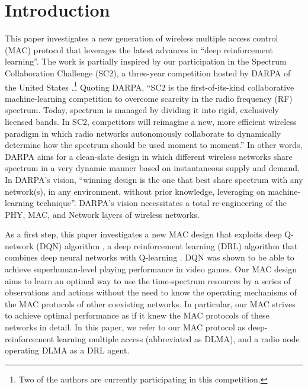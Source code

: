 \documentclass[journal,comsoc]{IEEEtran}
\begin{document}






%
\IEEEpeerreviewmaketitle



\section{Introduction}
This paper investigates a new generation of wireless multiple access control (MAC) protocol that leverages the latest advances in ``deep reinforcement learning''. The work is partially inspired by our participation in the Spectrum Collaboration Challenge (SC2), a three-year competition hosted by DARPA of the United States \cite{DARPAwebsite}.\footnote{Two of the authors are currently participating in this competition.} Quoting DARPA, ``SC2 is the first-of-its-kind collaborative machine-learning competition to overcome scarcity in the radio frequency (RF) spectrum. Today, spectrum is managed by dividing it into rigid, exclusively licensed bands. In SC2, competitors will reimagine a new, more efficient wireless paradigm in which radio networks autonomously collaborate to dynamically determine how the spectrum should be used moment to moment.'' In other words, DARPA aims for a clean-slate design in which different wireless networks share spectrum in a very dynamic manner based on instantaneous supply and demand. In DARPA's vision, ``winning design is the one that best share spectrum with any network(s), in any environment, without prior knowledge, leveraging on machine-learning technique''. DARPA's vision necessitates a total re-engineering of the PHY, MAC, and Network layers of wireless networks. 

As a first step, this paper investigates a new MAC design that exploits deep Q-network (DQN) algorithm \cite{DQNpaper}, a deep reinforcement learning (DRL) algorithm that combines deep neural networks \cite{lecun2015deep} with Q-learning \cite{watkins1992q}. DQN was shown to be able to achieve superhuman-level playing performance in video games. Our MAC design aims to learn an optimal way to use the time-spectrum resources by a series of observations and actions without the need to know the operating mechanisms of the MAC protocols of other coexisting networks. In particular, our MAC strives to achieve optimal performance as if it knew the MAC protocols of these networks in detail. In this paper, we refer to our MAC protocol as deep-reinforcement learning multiple access (abbreviated as DLMA), and a radio node operating DLMA as a DRL agent.  
\end{document}
